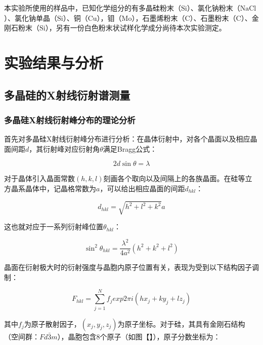 \documentclass{thuemp}
\begin{document}
本实验所使用的样品中，已知化学组分的有多晶硅粉末（$\text{Si}$）、氯化钠粉末（$\text{NaCl}$）、氯化钠单晶（$\text{Si}$）、铜（$\text{Cu}$），钼（$\text{Mo}$），石墨烯粉末（$\text{C}$）、石墨粉末（$\text{C}$）、金刚石粉末（$\text{Si}$），另有一份白色粉末状试样化学成分尚待本次实验测定。

\section{实验结果与分析}

\subsection{多晶硅的X射线衍射谱测量}

\subsubsection{多晶硅X射线衍射峰分布的理论分析}

首先对多晶硅X射线衍射峰分布进行分析：在晶体衍射中，对各个晶面以及相应晶面间距$d$，其衍射峰对应衍射角$\theta$满足Bragg公式：

\begin{equation}
    2d\sin\theta  = \lambda
    \label{eq:bragg}
\end{equation}

对于晶体引入晶面常数$(h,k,l)$刻画各个取向以及间隔上的各族晶面。在硅等立方晶系晶体中，记晶格常数为$a$，可以给出相应晶面的间距$d_{hkl}$：

\begin{equation}
    d_{hkl} = \sqrt{h^2+l^2+k^2} a
    \label{eq:d_hkl}
\end{equation}

这也就对应于一系列衍射峰位置$\theta_{hkl}$：

\begin{equation}
    \sin^2 \theta_{hkl} = \frac{\lambda^2}{4a^2}(h^2+k^2+l^2)
    \label{eq:theta_hkl}
\end{equation}

晶面在衍射极大时的衍射强度与晶胞内原子位置有关，表现为受到以下结构因子调制：

\begin{equation}
    F_{hkl} = \sum_{j = 1}^{N} f_j exp{2\pi i (hx_j + ky_j + lz_j)}
    \label{eq:structure_factor}
\end{equation}

其中$f_j$为原子散射因子，$(x_j,y_j,z_j)$为原子坐标。对于硅，其具有金刚石结构（空间群：$Fd\bar{3}m$），晶胞包含8个原子（如图【】），原子分数坐标为：
\end{document}
